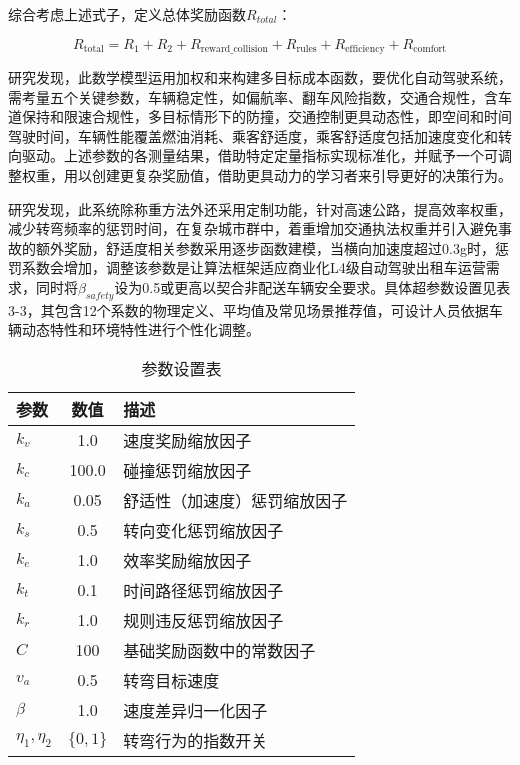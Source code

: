 综合考虑上述式子，定义总体奖励函数$𝑅_{total}$：

\begin{equation}
	R_{\text{total}} = R_1 + R_2 + R_{\text{reward\_collision}} + R_{\text{rules}} + R_{\text{efficiency}} + R_{\text{comfort}}
\end{equation}

研究发现，此数学模型运用加权和来构建多目标成本函数，要优化自动驾驶系统，需考量五个关键参数，车辆稳定性，如偏航率、翻车风险指数，交通合规性，含车道保持和限速合规性，多目标情形下的防撞，交通控制更具动态性，即空间和时间驾驶时间，车辆性能覆盖燃油消耗、乘客舒适度，乘客舒适度包括加速度变化和转向驱动。上述参数的各测量结果，借助特定定量指标实现标准化，并赋予一个可调整权重，用以创建更复杂奖励值，借助更具动力的学习者来引导更好的决策行为。

研究发现，此系统除称重方法外还采用定制功能，针对高速公路，提高效率权重，减少转弯频率的惩罚时间，在复杂城市群中，着重增加交通执法权重并引入避免事故的额外奖励，舒适度相关参数采用逐步函数建模，当横向加速度超过0.3g时，惩罚系数会增加，调整该参数是让算法框架适应商业化L4级自动驾驶出租车运营需求，同时将$β_{safety}$设为0.5或更高以契合非配送车辆安全要求。具体超参数设置见表3-3，其包含12个系数的物理定义、平均值及常见场景推荐值，可设计人员依据车辆动态特性和环境特性进行个性化调整。

\begin{table}[htbp]
	\centering
	\caption{参数设置表}
	\label{tab:parameters}
	\begin{tabular}{lcl}
		\toprule
		\textbf{参数} & \textbf{数值} & \textbf{描述} \\
		\midrule
		\( k_v \)     & 1.0     & 速度奖励缩放因子 \\
		\( k_c \)     & 100.0   & 碰撞惩罚缩放因子 \\
		\( k_a \)     & 0.05    & 舒适性（加速度）惩罚缩放因子 \\
		\( k_s \)     & 0.5     & 转向变化惩罚缩放因子 \\
		\( k_e \)     & 1.0     & 效率奖励缩放因子 \\
		\( k_t \)     & 0.1     & 时间路径惩罚缩放因子 \\
		\( k_r \)     & 1.0     & 规则违反惩罚缩放因子 \\
		\( C \)       & 100     & 基础奖励函数中的常数因子 \\
		\( v_a \)     & 0.5     & 转弯目标速度 \\
		\(\beta\)    & 1.0     & 速度差异归一化因子 \\
		\(\eta_1, \eta_2\) & \(\{0, 1\}\) & 转弯行为的指数开关 \\
		\bottomrule
	\end{tabular}
\end{table}


